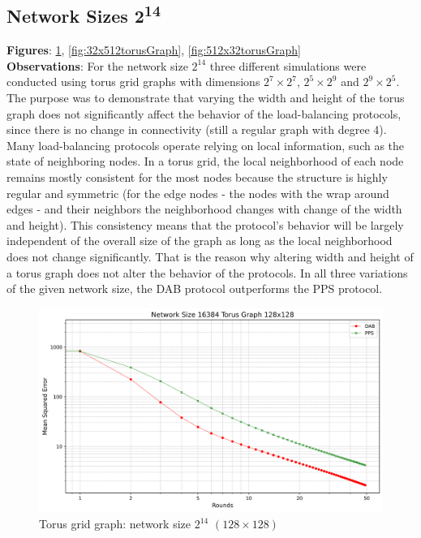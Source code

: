 \subsection{Network Sizes 2\textsuperscript{14}}
\textbf{Figures}: \ref{fig:16384torusGraph}, \ref{fig:32x512torusGraph}, \ref{fig:512x32torusGraph}\\
\textbf{Observations}: For the network size $2^{14}$ three different simulations were conducted using torus grid graphs with dimensions $2^{7} \times 2^{7}$, $2^{5} \times 2^{9}$ and $2^{9} \times 2^{5}$. The purpose was to demonstrate that varying the width and height of the torus graph does not significantly affect the behavior of the load-balancing protocols, since there is no change in connectivity (still a regular graph with degree 4). Many load-balancing protocols operate relying on local information, such as the state of neighboring nodes. In a torus grid, the local neighborhood of each node remains mostly consistent for the most nodes because the structure is highly regular and symmetric (for the edge nodes - the nodes with the wrap around edges - and their neighbors the neighborhood changes with change of the width and height). This consistency means that the protocol's behavior will be largely independent of the overall size of the graph as long as the local neighborhood does not change significantly. That is the reason why altering width and height of a torus graph does not alter the behavior of the protocols. In all three variations of the given network size, the DAB protocol outperforms the PPS protocol.\\
\begin{figure}[H]
    \centering
    \includegraphics[scale=0.5]{figures/torusGridGraphSimulations/128x128/DAB_vs_PPS_TG_r50_n16384.png}
    \caption{Torus grid graph: network size $2^{14}$ $(128\times128)$}
    \label{fig:16384torusGraph}
\end{figure}

